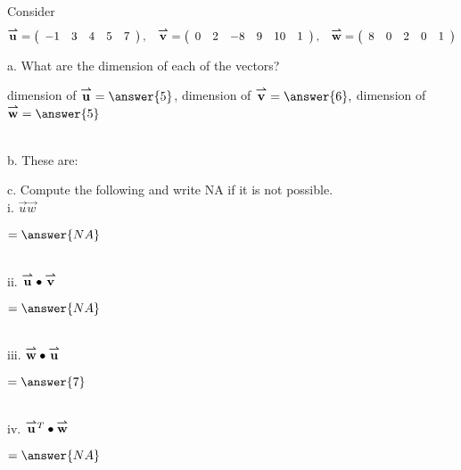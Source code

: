 \documentclass{ximera}
\author{Parisa Fatheddin}
\begin{document}
\begin{exercise}

Consider 
\begin{equation*}
\vec{u} = \left(\begin{array}{ccccc} -1 & 3 & 4 & 5 & 7
\end{array}\right), \hspace{.3cm} \vec{v} = \left(\begin{array}{cccccc} 
0 & 2 & -8 & 9 & 10 & 1 
\end{array}\right), \hspace{.3cm} \vec{w} = \left(\begin{array}{ccccc}
8 & 0 & 2 & 0 & 1
\end{array}\right)
\end{equation*}

a. What are the dimension of each of the vectors? \\

\begin{prompt}
dimension of $\vec{u}= \answer{5}$, \hspace{.4cm} dimension of $\vec{v}= \answer{6},$ \hspace{.4cm} dimension of $\vec{w} = \answer{5}$
\end{prompt}\\

b. These are:
\begin{multipleChoice}
\end{multipleChoice}

c. Compute the following and write NA if it is not possible. \\

i. $\vec{u}\vec{w}$ \begin{prompt} $= \answer{NA}$\end{prompt}\\

ii. $\vec{u} \dotp \vec{v}$ \begin{prompt} $= \answer{NA}$\end{prompt}\\

iii. $\vec{w} \dotp \vec{u}$ \begin{prompt} $= \answer{7}$\end{prompt}\\

iv. $\vec{u}^{T} \dotp \vec{w}$ \begin{prompt} $= \answer{NA}$\end{prompt}\\


\end{exercise}
\end{document}
